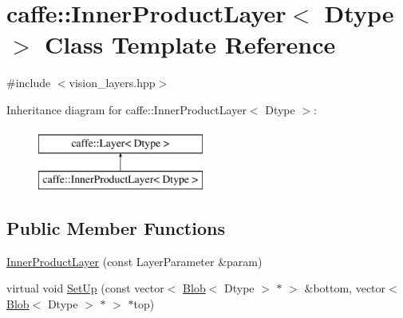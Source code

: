 \hypertarget{classcaffe_1_1_inner_product_layer}{\section{caffe\+:\+:Inner\+Product\+Layer$<$ Dtype $>$ Class Template Reference}
\label{classcaffe_1_1_inner_product_layer}
}


{\ttfamily \#include $<$vision\+\_\+layers.\+hpp$>$}

Inheritance diagram for caffe\+:\+:Inner\+Product\+Layer$<$ Dtype $>$\+:\begin{figure}[H]
\begin{center}
\leavevmode
\includegraphics[height=2.000000cm]{classcaffe_1_1_inner_product_layer}
\end{center}
\end{figure}
\subsection*{Public Member Functions}
\begin{DoxyCompactItemize}
\item 
\hyperlink{classcaffe_1_1_inner_product_layer_a997e3c54ed0414ebcd8eec13f083af07}{Inner\+Product\+Layer} (const Layer\+Parameter \&param)
\item 
virtual void \hyperlink{classcaffe_1_1_inner_product_layer_a3e95f827d46406c96575d8852b4d68fe}{Set\+Up} (const vector$<$ \hyperlink{classcaffe_1_1_blob}{Blob}$<$ Dtype $>$ $\ast$ $>$ \&bottom, vector$<$ \hyperlink{classcaffe_1_1_blob}{Blob}$<$ Dtype $>$ $\ast$ $>$ $\ast$top)
\end{DoxyCompactItemize}
